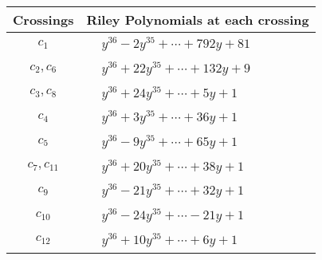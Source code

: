 \documentclass[1p]{elsarticle_modified}
\theoremstyle{definition}
\begin{document}
\begin{tabular}{m{50pt}|m{274pt}}
Crossings & \hspace{64pt}Riley Polynomials at each crossing \\
\hline $$\begin{aligned}c_{1}\end{aligned}$$&$\begin{aligned}
&y^{36}-2 y^{35}+\cdots+792 y+81
\end{aligned}$\\
\hline $$\begin{aligned}c_{2},c_{6}\end{aligned}$$&$\begin{aligned}
&y^{36}+22 y^{35}+\cdots+132 y+9
\end{aligned}$\\
\hline $$\begin{aligned}c_{3},c_{8}\end{aligned}$$&$\begin{aligned}
&y^{36}+24 y^{35}+\cdots+5 y+1
\end{aligned}$\\
\hline $$\begin{aligned}c_{4}\end{aligned}$$&$\begin{aligned}
&y^{36}+3 y^{35}+\cdots+36 y+1
\end{aligned}$\\
\hline $$\begin{aligned}c_{5}\end{aligned}$$&$\begin{aligned}
&y^{36}-9 y^{35}+\cdots+65 y+1
\end{aligned}$\\
\hline $$\begin{aligned}c_{7},c_{11}\end{aligned}$$&$\begin{aligned}
&y^{36}+20 y^{35}+\cdots+38 y+1
\end{aligned}$\\
\hline $$\begin{aligned}c_{9}\end{aligned}$$&$\begin{aligned}
&y^{36}-21 y^{35}+\cdots+32 y+1
\end{aligned}$\\
\hline $$\begin{aligned}c_{10}\end{aligned}$$&$\begin{aligned}
&y^{36}-24 y^{35}+\cdots-21 y+1
\end{aligned}$\\
\hline $$\begin{aligned}c_{12}\end{aligned}$$&$\begin{aligned}
&y^{36}+10 y^{35}+\cdots+6 y+1
\end{aligned}$\\
\hline
\end{tabular}\\~\\
\end{document}
